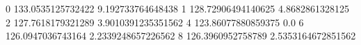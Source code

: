 0 133.0535125732422 9.192733764648438
1 128.72906494140625 4.8682861328125
2 127.7618179321289 3.9010391235351562
4 123.86077880859375 0.0
6 126.0947036743164 2.2339248657226562
8 126.3960952758789 2.5353164672851562
